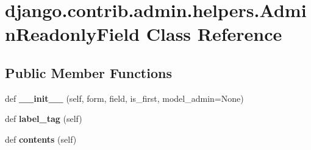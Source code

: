 \hypertarget{classdjango_1_1contrib_1_1admin_1_1helpers_1_1_admin_readonly_field}{}\section{django.\+contrib.\+admin.\+helpers.\+Admin\+Readonly\+Field Class Reference}
\label{classdjango_1_1contrib_1_1admin_1_1helpers_1_1_admin_readonly_field}
\subsection*{Public Member Functions}
\begin{DoxyCompactItemize}
\item 
\mbox{\label{classdjango_1_1contrib_1_1admin_1_1helpers_1_1_admin_readonly_field_adb6ce05b6180527713cc983c21ad0a3a}} 
def {\bfseries \+\_\+\+\_\+init\+\_\+\+\_\+} (self, form, field, is\+\_\+first, model\+\_\+admin=None)
\item 
\mbox{\label{classdjango_1_1contrib_1_1admin_1_1helpers_1_1_admin_readonly_field_a940d5b5bbad4a0bfa3d37016385daeba}} 
def {\bfseries label\+\_\+tag} (self)
\item 
\mbox{\label{classdjango_1_1contrib_1_1admin_1_1helpers_1_1_admin_readonly_field_aac0b3c9ddfce9b47d57dc36c1be9513e}} 
def {\bfseries contents} (self)
\end{DoxyCompactItemize}
